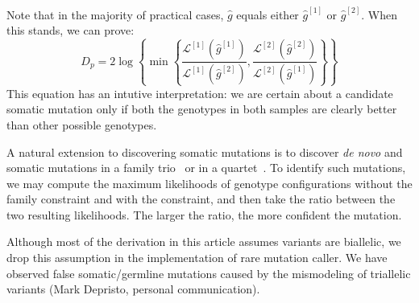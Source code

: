 \documentclass{bioinfo}
\begin{document}
\begin{methods}
Note that in the majority of practical cases, $\hat{g}$ equals either
$\hat{g}^{[1]}$ or $\hat{g}^{[2]}$.  When this stands, we can prove:
$$
D_p=2\log\left\{ \min\left\{\frac{\mathcal{L}^{[1]}(\hat{g}^{[1]})}{\mathcal{L}^{[1]}(\hat{g}^{[2]})},\frac{\mathcal{L}^{[2]}(\hat{g}^{[2]})}{\mathcal{L}^{[2]}(\hat{g}^{[1]})}\right\}\right\}
$$
This equation has an intutive interpretation: we are certain about a candidate
somatic mutation only if both the genotypes in both samples are clearly better
than other possible genotypes.

A natural extension to discovering somatic mutations is to discover {\it de
novo} and somatic mutations in a family trio~\citep{Conrad:2011kx} or in a
quartet~\citep{Roach:2010oq}. To identify such mutations, we may compute the
maximum likelihoods of genotype configurations without the family constraint
and with the constraint, and then take the ratio between the two resulting
likelihoods. The larger the ratio, the more confident the mutation.

Although most of the derivation in this article assumes variants are biallelic,
we drop this assumption in the implementation of rare mutation caller.  We have
observed false somatic/germline mutations caused by the mismodeling of
triallelic variants (Mark Depristo, personal communication).


\end{methods}
\end{document}
